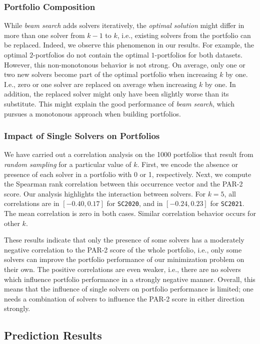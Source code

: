\documentclass[a4paper,USenglish,pdfa]{lipics-v2021} %
\begin{document}
\subsubsection{Portfolio Composition}

While \emph{beam search} adds solvers iteratively, the \emph{optimal solution} might differ in more than one solver from $k-1$ to $k$, i.e., existing solvers from the portfolio can be replaced.
Indeed, we observe this phenomenon in our results.
For example, the optimal $2$-portfolios do not contain the optimal $1$-portfolios for both datasets.
However, this non-monotonous behavior is not strong.
On average, only one or two new solvers become part of the optimal portfolio when increasing $k$ by one.
I.e., zero or one solver are replaced on average when increasing $k$ by one.
In addition, the replaced solver might only have been slightly worse than its substitute.
This might explain the good performance of \emph{beam search}, which pursues a monotonous approach when building portfolios.

\subsubsection{Impact of Single Solvers on Portfolios}

We have carried out a correlation analysis on the 1000 portfolios that result from \emph{random sampling} for a particular value of $k$. 
First, we encode the absence or presence of each solver in a portfolio with 0 or 1, respectively.
Next, we compute the Spearman rank correlation between this occurrence vector and the PAR-2 score.
Our analysis highlights the interaction between solvers. 
For $k=5$, all correlations are in $[-0.40,0.17]$ for \texttt{SC2020}, and in $[-0.24,0.23]$ for \texttt{SC2021}.
The mean correlation is zero in both cases.
Similar correlation behavior occurs for other $k$.

These results indicate that only the presence of some solvers has a moderately negative correlation to the PAR-2 score of the whole portfolio, i.e., only some solvers can improve the portfolio performance of our minimization problem on their own.
The positive correlations are even weaker, i.e., there are no solvers which influence portfolio performance in a strongly negative manner.
Overall, this means that the influence of single solvers on portfolio performance is limited; one needs a combination of solvers to influence the PAR-2 score in either direction strongly.

\subsection{Prediction Results}
\end{document}
